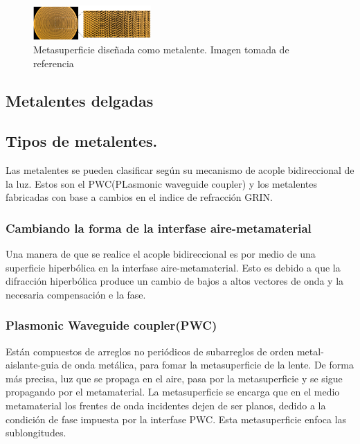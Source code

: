 \documentclass[a4paper, twocolumn, 10pt]{article}
\begin{document}
\begin{figure}[H]
    \centering
    \includegraphics[width= 0.4\textwidth]{imagenarreglo.png}
    \caption{Metasuperficie diseñada como metalente. Imagen tomada de referencia \cite{li2019metalens}}
    \label{metasuperficie}
\end{figure}

\subsection*{Metalentes delgadas}

\subsection*{Tipos de metalentes.}


Las metalentes se pueden clasificar según su mecanismo de acople bidireccional de la luz. Estos son el PWC(PLasmonic waveguide coupler) y los metalentes fabricadas con base a cambios en el indice de refracción GRIN.

\subsubsection*{Cambiando la forma de la interfase aire-metamaterial}

Una manera de que se realice el acople bidireccional es por medio de una superficie hiperbólica en la interfase aire-metamaterial. Esto es debido a que la difracción hiperbólica produce un cambio de bajos a altos vectores de onda y la necesaria compensación e la fase.

\subsubsection*{Plasmonic Waveguide coupler(PWC)}

Están compuestos de arreglos no periódicos de subarreglos de orden metal-aislante-guia de onda metálica, para fomar la metasuperficie de la lente. De forma más precisa, luz que se propaga en el aire, pasa por la metasuperficie y se sigue propagando por el metamaterial. La metasuperficie se encarga que en el  medio metamaterial los frentes de onda incidentes dejen de ser planos, dedido a la condición de fase impuesta por  la interfase PWC. Esta metasuperficie enfoca las sublongitudes\cite{lu2012hyperlenses}.
\end{document}
